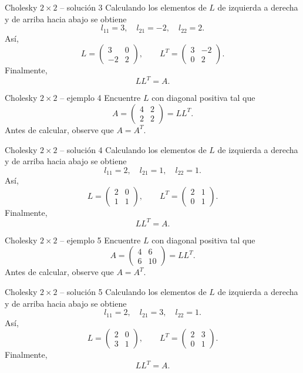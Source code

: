 \documentclass[aspectratio=169,10pt]{beamer}
\begin{document}
\begin{frame}{Cholesky $2\times 2$ -- solución 3}
\small
Calculando los elementos de $L$ de izquierda a derecha y de arriba hacia abajo se obtiene
\[
l_{11}=3,\quad l_{21}=-2,\quad l_{22}=2.
\]
Así,
\[
L=\begin{pmatrix}3 & 0\\-2 & 2\end{pmatrix},\qquad L^T=\begin{pmatrix}3 & -2\\0 & 2\end{pmatrix}.
\]
Finalmente,
\[
\boxed{LL^T=A}.
\]
\end{frame}
\begin{frame}{Cholesky $2\times 2$ -- ejemplo 4}
\small
Encuentre $L$ con diagonal positiva tal que
\[
A=\begin{pmatrix}4 & 2\\2 & 2\end{pmatrix}=LL^T.
\]
Antes de calcular, observe que $A=A^T$.
\end{frame}
\begin{frame}{Cholesky $2\times 2$ -- solución 4}
\small
Calculando los elementos de $L$ de izquierda a derecha y de arriba hacia abajo se obtiene
\[
l_{11}=2,\quad l_{21}=1,\quad l_{22}=1.
\]
Así,
\[
L=\begin{pmatrix}2 & 0\\1 & 1\end{pmatrix},\qquad L^T=\begin{pmatrix}2 & 1\\0 & 1\end{pmatrix}.
\]
Finalmente,
\[
\boxed{LL^T=A}.
\]
\end{frame}
\begin{frame}{Cholesky $2\times 2$ -- ejemplo 5}
\small
Encuentre $L$ con diagonal positiva tal que
\[
A=\begin{pmatrix}4 & 6\\6 & 10\end{pmatrix}=LL^T.
\]
Antes de calcular, observe que $A=A^T$.
\end{frame}
\begin{frame}{Cholesky $2\times 2$ -- solución 5}
\small
Calculando los elementos de $L$ de izquierda a derecha y de arriba hacia abajo se obtiene
\[
l_{11}=2,\quad l_{21}=3,\quad l_{22}=1.
\]
Así,
\[
L=\begin{pmatrix}2 & 0\\3 & 1\end{pmatrix},\qquad L^T=\begin{pmatrix}2 & 3\\0 & 1\end{pmatrix}.
\]
Finalmente,
\[
\boxed{LL^T=A}.
\]
\end{frame}
\end{document}
